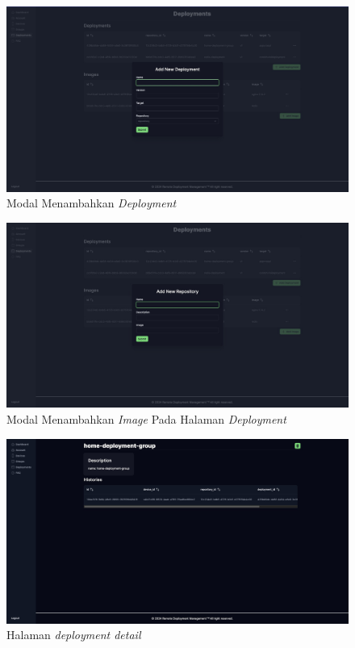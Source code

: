 \begin{figure}[ht]
  \centering
  \includegraphics[width=1\textwidth]{resources/chapter-4/dashboard/deployment-page-add-deployment.jpg}
  \caption{Modal Menambahkan \textit{Deployment}}
  \label{fig:halaman-deployment-add-deployment}
\end{figure}

\begin{figure}[ht]
  \centering
  \includegraphics[width=1\textwidth]{resources/chapter-4/dashboard/deployment-page-add-repostory.jpg}
  \caption{Modal Menambahkan \textit{Image} Pada Halaman \textit{Deployment}}
  \label{fig:halaman-deployment-add-repostory}
\end{figure}

\begin{figure}[ht]
  \centering
  \includegraphics[width=1\textwidth]{resources/chapter-4/dashboard/deployment-detail-page.jpg}
  \caption{Halaman \textit{deployment detail}}
  \label{fig:halaman-deployment-detail}
\end{figure}

